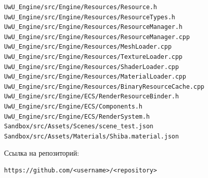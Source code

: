 \documentclass[14pt,a4paper]{extarticle}
\begin{document}
\begin{verbatim}
UwU_Engine/src/Engine/Resources/Resource.h
UwU_Engine/src/Engine/Resources/ResourceTypes.h
UwU_Engine/src/Engine/Resources/ResourceManager.h
UwU_Engine/src/Engine/Resources/ResourceManager.cpp
UwU_Engine/src/Engine/Resources/MeshLoader.cpp
UwU_Engine/src/Engine/Resources/TextureLoader.cpp
UwU_Engine/src/Engine/Resources/ShaderLoader.cpp
UwU_Engine/src/Engine/Resources/MaterialLoader.cpp
UwU_Engine/src/Engine/Resources/BinaryResourceCache.cpp
UwU_Engine/src/Engine/ECS/RenderResourceBinder.h
UwU_Engine/src/Engine/ECS/Components.h
UwU_Engine/src/Engine/ECS/RenderSystem.h
Sandbox/src/Assets/Scenes/scene_test.json
Sandbox/src/Assets/Materials/Shiba.material.json
\end{verbatim}

Ссылка на репозиторий:

\begin{verbatim}
https://github.com/<username>/<repository>
\end{verbatim}
\end{document}
